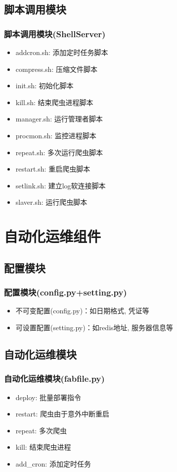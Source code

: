 \documentclass{beamer}
\begin{document}
\subsection{脚本调用模块}
\begin{frame}
\frametitle{脚本调用模块(ShellServer)}
\begin{itemize}
\item addcron.sh: 添加定时任务脚本
\item compress.sh: 压缩文件脚本
\item init.sh: 初始化脚本
\item kill.sh: 结束爬虫进程脚本
\item manager.sh: 运行管理者脚本
\item procmon.sh: 监控进程脚本
\item repeat.sh: 多次运行爬虫脚本
\item restart.sh: 重启爬虫脚本
\item setlink.sh: 建立log软连接脚本
\item slaver.sh: 运行爬虫脚本
\end{itemize}
\end{frame}

\section{自动化运维组件}
\subsection{配置模块}
\begin{frame}
\frametitle{配置模块(config.py+setting.py)}
\begin{itemize}
\item 不可变配置(config.py)：如日期格式, 凭证等
\item 可设置配置(setting.py)：如redis地址, 服务器信息等
\end{itemize}
\end{frame}

\subsection{自动化运维模块}
\begin{frame}
\frametitle{自动化运维模块(fabfile.py)}
\begin{itemize}
\item deploy: 批量部署指令
\item restart: 爬虫由于意外中断重启
\item repeat: 多次爬虫
\item kill: 结束爬虫进程
\item add\_cron: 添加定时任务
\end{itemize}
\end{frame}
\end{document}
